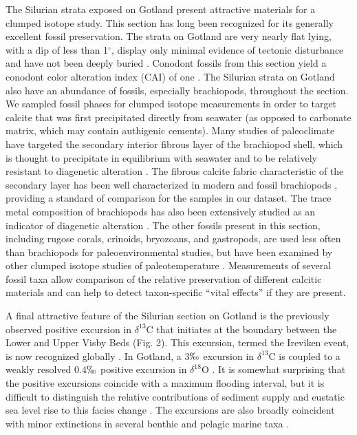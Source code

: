 \documentclass[preprint, authoryear]{elsarticle}
\begin{document}
The Silurian strata exposed on Gotland present attractive materials for a clumped isotope study. This section has long been recognized for its generally excellent fossil preservation. The strata on Gotland are very nearly flat lying, with a dip of less than 1$^{\circ}$, display only minimal evidence of tectonic disturbance and have not been deeply buried \citep{Calner2004a, Jeppsson1983}. Conodont fossils from this section yield a conodont color alteration index (CAI) of one \citep{Epstein1976, Jeppsson1983}. The Silurian strata on Gotland also have an abundance of fossils, especially brachiopods, throughout the section. We sampled fossil phases for clumped isotope measurements in order to target calcite that was first precipitated directly from seawater (as opposed to carbonate matrix, which may contain authigenic cements). Many studies of paleoclimate have targeted the secondary interior fibrous layer of the brachiopod shell, which is thought to precipitate in equilibrium with seawater and to be relatively resistant to diagenetic alteration \citep{Azmy1998, Samtleben2001}. The fibrous calcite fabric characteristic of the secondary layer has been well characterized in modern and fossil brachiopods \citep{PerezHuerta2007, Samtleben2001, Schmahl2004}, providing a standard of comparison for the samples in our dataset. The trace metal composition of brachiopods has also been extensively studied as an indicator of diagenetic alteration \citep{Azmy1998, Brand2003, Brand2012, Mii1994, Grossman1996, Shields2003}. The other fossils present in this section, including rugose corals, crinoids, bryozoans, and gastropods, are used less often than brachiopods for paleoenvironmental studies, but have been examined by other clumped isotope studies of paleotemperature \citep{Came2007, Dennis2013, Finnegan2011}. Measurements of several fossil taxa allow comparison of the relative preservation of different calcitic materials and can help to detect taxon-specific ``vital effects'' if they are present. 

A final attractive feature of the Silurian section on Gotland is the previously observed positive excursion in $\delta^{13}$C that initiates at the boundary between the Lower and Upper Visby Beds (Fig. 2). This excursion, termed the Ireviken event, is now recognized globally \citep{Munnecke2003}. In Gotland, a 3$\permil$ excursion in $\delta^{13}$C is coupled to a weakly resolved 0.4$\permil$ positive excursion in $\delta^{18}$O \citep{Munnecke2003}. It is somewhat surprising that the positive excursions coincide with a maximum flooding interval, but it is difficult to distinguish the relative contributions of sediment supply and eustatic sea level rise to this facies change \citep{Calner2004a}. The excursions are also broadly coincident with minor extinctions in several benthic and pelagic marine taxa \citep{Munnecke2003}. 
\end{document}
